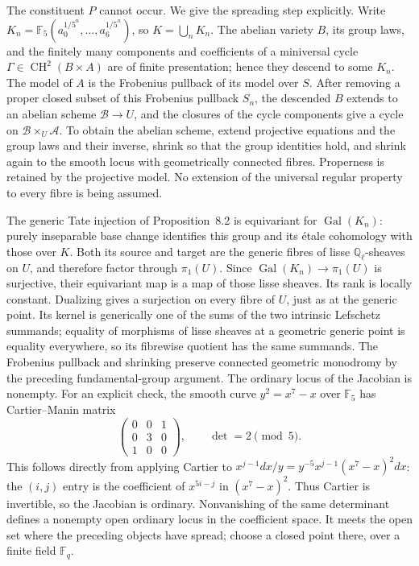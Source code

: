 The constituent $P$ cannot occur.  We give the spreading
step explicitly.  Write
$K_n=\mathbb F_5(a_0^{1/5^n},\ldots,a_6^{1/5^n})$, so
$K=\bigcup_nK_n$.  The abelian variety $B$, its group laws,
and the finitely many components and coefficients of a
miniversal cycle $\Gamma\in\operatorname{CH}^2(B\times A)$
are of finite presentation; hence they descend to some $K_n$.
The model of $A$ is the Frobenius pullback of its model over
$S$.  After removing a proper closed subset of this Frobenius
pullback $S_n$, the descended $B$ extends to an abelian scheme
$\mathcal B\to U$, and the closures of the cycle components
give a cycle on $\mathcal B\times_U\mathcal A$.  To obtain
the abelian scheme, extend projective equations and the group
laws and their inverse, shrink so that the group identities
hold, and shrink again to the smooth locus with geometrically
connected fibres.  Properness is retained by the projective
model.  No extension of the universal regular property to every
fibre is being assumed.

The generic Tate injection of Proposition~8.2 is equivariant
for $\operatorname{Gal}(K_n)$: purely inseparable base change
identifies this group and its étale cohomology with those over
$K$.  Both its source and target are the generic fibres of
lisse $\mathbb Q_\ell$-sheaves on $U$, and therefore factor
through $\pi_1(U)$.  Since
$\operatorname{Gal}(K_n)\to\pi_1(U)$ is surjective, their
equivariant map is a map of those lisse sheaves.  Its rank is
locally constant.  Dualizing gives a surjection on every fibre
of $U$, just as at the generic point.  Its kernel is generically
one of the sums of the two intrinsic Lefschetz summands;
equality of morphisms of lisse sheaves at a geometric generic
point is equality everywhere, so its fibrewise quotient has the
same summands.  The Frobenius pullback and shrinking preserve
connected geometric monodromy by the preceding fundamental-group
argument.  The ordinary locus of the Jacobian is
nonempty.  For an explicit check, the smooth curve
$y^2=x^7-x$ over $\mathbb F_5$ has Cartier--Manin matrix
\[
 \begin{pmatrix}0&0&1\\0&3&0\\1&0&0\end{pmatrix},
 \qquad\det=2\pmod5.
\]
This follows directly from applying Cartier to
$x^{j-1}dx/y=y^{-5}x^{j-1}(x^7-x)^2dx$:
the $(i,j)$ entry is the coefficient of $x^{5i-j}$ in
$(x^7-x)^2$.  Thus Cartier is invertible, so the Jacobian is
ordinary.  Nonvanishing of the same determinant defines a
nonempty open ordinary locus in the coefficient space.  It
meets the open set where the preceding objects have spread;
choose a closed point there, over a finite field $\mathbb F_q$.

